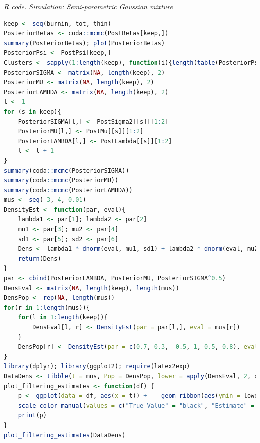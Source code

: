\begin{enumerate}[leftmargin=*]
\begin{tcolorbox}[enhanced,width=4.67in,center upper,
	fontupper=\large\bfseries,drop shadow southwest,sharp corners]
	\textit{R code. Simulation: Semi-parametric Gaussian mixture}
	\begin{VF}
		\begin{lstlisting}[language=R]
keep <- seq(burnin, tot, thin)
PosteriorBetas <- coda::mcmc(PostBetas[keep,])
summary(PosteriorBetas); plot(PosteriorBetas)
PosteriorPsi <- PostPsi[keep,]
Clusters <- sapply(1:length(keep), function(i){length(table(PosteriorPsi[i,]))})
PosteriorSIGMA <- matrix(NA, length(keep), 2)
PosteriorMU <- matrix(NA, length(keep), 2)
PosteriorLAMBDA <- matrix(NA, length(keep), 2)
l <- 1
for (s in keep){
	PosteriorSIGMA[l,] <- PostSigma2[[s]][1:2]
	PosteriorMU[l,] <- PostMu[[s]][1:2]
	PosteriorLAMBDA[l,] <- PostLambda[[s]][1:2]
	l <- l + 1
}
summary(coda::mcmc(PosteriorSIGMA))
summary(coda::mcmc(PosteriorMU))
summary(coda::mcmc(PosteriorLAMBDA))
mus <- seq(-3, 4, 0.01)
DensityEst <- function(par, eval){
	lambda1 <- par[1]; lambda2 <- par[2]
	mu1 <- par[3]; mu2 <- par[4]
	sd1 <- par[5]; sd2 <- par[6]
	Dens <- lambda1 * dnorm(eval, mu1, sd1) + lambda2 * dnorm(eval, mu2, sd2)
	return(Dens)
}
par <- cbind(PosteriorLAMBDA, PosteriorMU, PosteriorSIGMA^0.5)
DensEval <- matrix(NA, length(keep), length(mus))
DensPop <- rep(NA, length(mus))
for(r in 1:length(mus)){
	for(l in 1:length(keep)){
		DensEval[l, r] <- DensityEst(par = par[l,], eval = mus[r])
	}
	DensPop[r] <- DensityEst(par = c(0.7, 0.3, -0.5, 1, 0.5, 0.8), eval = mus[r]) 
}
library(dplyr); library(ggplot2); require(latex2exp)
DataDens <- tibble(t = mus, Pop = DensPop, lower = apply(DensEval, 2, quantile, probs = 0.025), upper = apply(DensEval, 2, quantile, probs = 0.975), meanT = colMeans(DensEval))
plot_filtering_estimates <- function(df) {
	p <- ggplot(data = df, aes(x = t)) + 	geom_ribbon(aes(ymin = lower, ymax = upper), alpha = 1, fill = "lightblue") + 	geom_line(aes(y = Pop, color = "True Value"), linewidth = 0.5) + 	geom_line(aes(y = meanT, color = "Estimate"), linewidth = 0.5) +
	scale_color_manual(values = c("True Value" = "black", "Estimate" = "blue")) + xlab(TeX("$\\mu$")) + ylab("Density") + 	labs(title = "Density: Stochastic Errors", color = "") + theme_minimal()
	print(p)
}
plot_filtering_estimates(DataDens)
\end{lstlisting}
	\end{VF}
\end{tcolorbox}


\end{enumerate}
